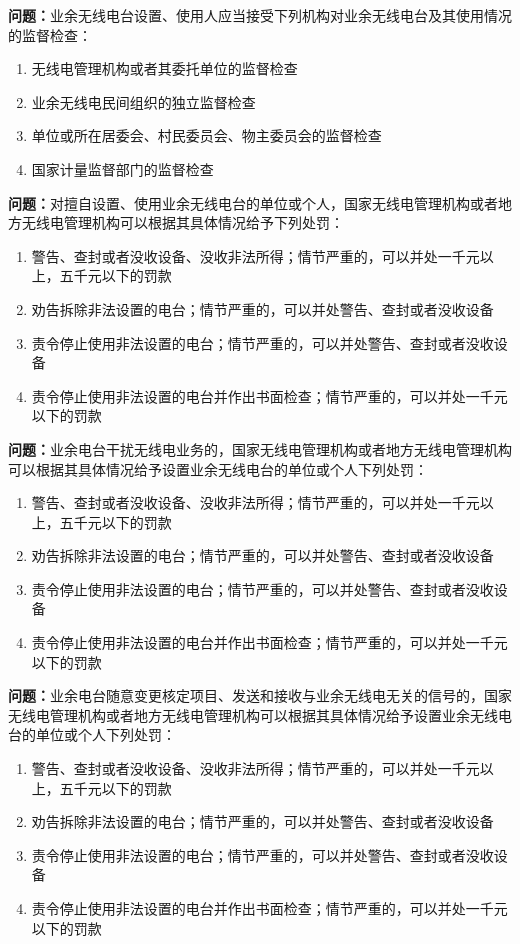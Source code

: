 \bigskip


\noindent\textbf{问题：}业余无线电台设置、使用人应当接受下列机构对业余无线电台及其使用情况的监督检查：
\begin{enumerate}[label=\Alph*), leftmargin=3em]
\item 无线电管理机构或者其委托单位的监督检查
\item 业余无线电民间组织的独立监督检查
\item 单位或所在居委会、村民委员会、物主委员会的监督检查
\item 国家计量监督部门的监督检查
\end{enumerate}

\bigskip


\noindent\textbf{问题：}对擅自设置、使用业余无线电台的单位或个人，国家无线电管理机构或者地方无线电管理机构可以根据其具体情况给予下列处罚：
\begin{enumerate}[label=\Alph*), leftmargin=3em]
\item 警告、查封或者没收设备、没收非法所得；情节严重的，可以并处一千元以上，五千元以下的罚款
\item 劝告拆除非法设置的电台；情节严重的，可以并处警告、查封或者没收设备
\item 责令停止使用非法设置的电台；情节严重的，可以并处警告、查封或者没收设备
\item 责令停止使用非法设置的电台并作出书面检查；情节严重的，可以并处一千元以下的罚款
\end{enumerate}

\bigskip


\noindent\textbf{问题：}业余电台干扰无线电业务的，国家无线电管理机构或者地方无线电管理机构可以根据其具体情况给予设置业余无线电台的单位或个人下列处罚：
\begin{enumerate}[label=\Alph*), leftmargin=3em]
\item 警告、查封或者没收设备、没收非法所得；情节严重的，可以并处一千元以上，五千元以下的罚款
\item 劝告拆除非法设置的电台；情节严重的，可以并处警告、查封或者没收设备
\item 责令停止使用非法设置的电台；情节严重的，可以并处警告、查封或者没收设备
\item 责令停止使用非法设置的电台并作出书面检查；情节严重的，可以并处一千元以下的罚款
\end{enumerate}

\bigskip


\noindent\textbf{问题：}业余电台随意变更核定项目、发送和接收与业余无线电无关的信号的，国家无线电管理机构或者地方无线电管理机构可以根据其具体情况给予设置业余无线电台的单位或个人下列处罚：
\begin{enumerate}[label=\Alph*), leftmargin=3em]
\item 警告、查封或者没收设备、没收非法所得；情节严重的，可以并处一千元以上，五千元以下的罚款
\item 劝告拆除非法设置的电台；情节严重的，可以并处警告、查封或者没收设备
\item 责令停止使用非法设置的电台；情节严重的，可以并处警告、查封或者没收设备
\item 责令停止使用非法设置的电台并作出书面检查；情节严重的，可以并处一千元以下的罚款
\end{enumerate}

